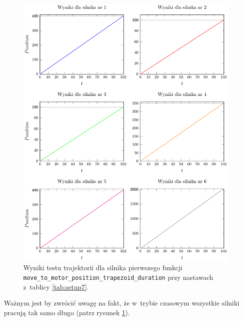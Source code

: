 \documentclass[a4paper, 12pt]{article}
\begin{document}
	\begin{figure}[H]
		\centering
		\includegraphics[scale=1.1]{raport_graphs/simpMPDall.pdf}
		\caption{Wyniki testu trajektorii dla silnika pierwszego funkcji \texttt{move\_to\_motor\_position\_trapezoid\_duration} przy nastawach z~tablicy \ref{tab:setup7}.}
		\label{fig:simpMPDall}
	\end{figure}	
	
	Ważnym jest by zwrócić uwagę na fakt, że w~trybie czasowym wszystkie silniki pracują tak samo długo (patrz rysunek \ref{fig:simpMPDall}).
	
\end{document}

